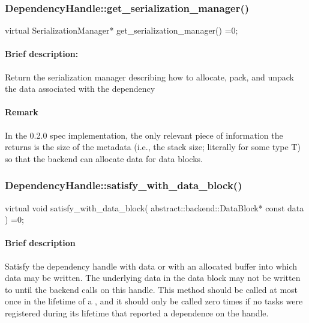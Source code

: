 \subsubsection{DependencyHandle::get\_serialization\_manager()}
\begin{CppCode}
    virtual SerializationManager*
    get_serialization_manager() =0;
\end{CppCode}

\paragraph{Brief description:} Return the serialization manager describing how to allocate, pack, and unpack the data
       associated with the dependency
     
\paragraph{Remark} In the 0.2.0 spec implementation, the only relevant piece of information the 
       returns is the size of the metadata (i.e., the stack size; literally  for some type T) so that
       the backend can allocate data for data blocks.
     
\subsubsection{DependencyHandle::satisfy\_with\_data\_block()}
\begin{CppCode}
    virtual void
    satisfy_with_data_block(
      abstract::backend::DataBlock* const data
    ) =0;
\end{CppCode}

\paragraph{Brief description} Satisfy the dependency handle with data or with an allocated buffer into which data
       may be written.
       The underlying data in the data block may not be written to until the backend calls
        on this handle.  This method should be called at most
       once in the lifetime of a , and it should only be called zero times if
       no tasks were registered during its lifetime that reported a dependence on the handle.
     
